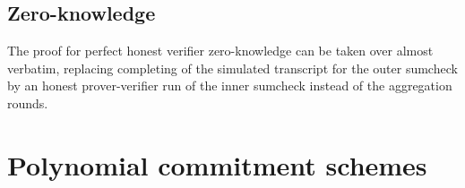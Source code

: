 \documentclass[10pt,article,oneside]{memoir}
\theoremstyle{definition}
\newtheorem{defn}[thm]{Definition}
\theoremstyle{remark}
\DeclareMathOperator{\setup}{\mathsf{Setup}}
\DeclareMathOperator{\comm}{\mathsf{Com}}
\begin{document}
\subsection{Zero-knowledge}
The proof for perfect honest verifier zero-knowledge can be taken over almost verbatim, replacing completing of the simulated transcript for the outer sumcheck by an honest prover-verifier run of the inner sumcheck instead of the aggregation rounds.

\section{Polynomial commitment schemes}
\label{s:PolynomialCommitments}

\end{document}
